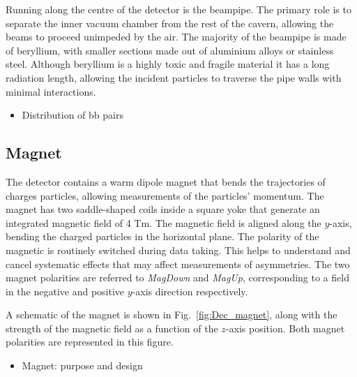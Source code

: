 Running along the centre of the detector is the \lhcb beampipe. The primary role is to separate the inner vacuum chamber from the rest of the cavern, allowing the beams to proceed unimpeded by the air. The majority of the beampipe is made of beryllium, with smaller sections made out of aluminium alloys or stainless steel. Although beryllium is a highly toxic and fragile material it has a long radiation length, allowing the incident particles to traverse the pipe walls with minimal interactions.  


{\color{Green}
\begin{itemize}
\item Distribution of bb pairs
\end{itemize}
}

\subsection{Magnet}

The \lhcb detector contains a warm dipole magnet that bends the trajectories of charges particles, allowing measurements of the particles' momentum. The magnet has two saddle-shaped coils inside a square yoke that generate an integrated magnetic field of 4 Tm.  
The magnetic field is aligned along the $y$-axis, bending the charged particles in the horizontal plane. The polarity of the magnetic is routinely switched during data taking. This helps to understand and cancel systematic effects that may affect measurements of \CP asymmetries. The two magnet polarities are referred to \emph{MagDown} and \emph{MagUp}, corresponding to a field in the negative and positive $y$-axis direction respectively.   

A schematic of the magnet is shown in Fig.~\ref{fig:Dec_magnet}, along with the strength of the magnetic field as a function of the $z$-axis position. Both magnet polarities are represented in this figure. 

{\color{Red}
\begin{itemize}
\item Magnet: purpose and design 
\end{itemize}
}


